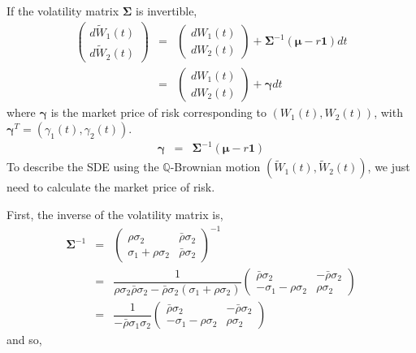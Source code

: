 \documentclass[uplatex,a4j,12pt,dvipdfmx]{jsarticle}
\begin{document}
%
%
If the volatility matrix ${\bm \Sigma}$ is invertible,
%
%
\begin{eqnarray*}
	\left(
	\begin{array}{c}
			d \tilde{W}_{1}(t)
			\\
			d \tilde{W}_{2}(t)
		\end{array}
	\right)
	&=&
	\left(
	\begin{array}{c}
			dW_{1}(t)
			\\
			dW_{2}(t)
		\end{array}
	\right)
	+
	{\bm \Sigma}^{-1}
	( {\bm \mu} - r {\bm 1} ) dt
	\\ &=&
	\left(
	\begin{array}{c}
			dW_{1}(t)
			\\
			dW_{2}(t)
		\end{array}
	\right)
	+
	{\bm \gamma}dt
\end{eqnarray*}
%
%
where ${\bm \gamma}$ is the market price of risk corresponding to $(W_{1}(t),W_{2}(t))$, with ${\bm \gamma}^{T} = (\gamma_{1}(t),\gamma_{2}(t))$.
%
%
\begin{eqnarray*}
	{\bm \gamma}
	&=&
	{\bm \Sigma}^{-1}
	( {\bm \mu} - r {\bm 1} )
\end{eqnarray*}
%
%
To describe the SDE using the $\mathbb{Q}$-Brownian motion $(\tilde{W}_{1}(t),\tilde{W}_{2}(t))$, we just need to calculate the market price of risk.

First, the inverse of the volatility matrix is,
%
%
\begin{eqnarray*}
	{\bm \Sigma}^{-1}
	&=&
	\left(
	\begin{array}{cc}
		\rho \sigma_{2}              & \bar{\rho} \sigma_{2}
		\\
		\sigma_{1} + \rho \sigma_{2} & \bar{\rho} \sigma_{2}
	\end{array}
	\right)^{-1}
	\\ &=&
	\dfrac{1}{
		\rho \sigma_{2} \bar{\rho} \sigma_{2} - \bar{\rho} \sigma_{2}(\sigma_{1} + \rho \sigma_{2}) }
	\left(
	\!\!
	\begin{array}{cc}
			\bar{\rho} \sigma_{2}          & - \bar{\rho} \sigma_{2}
			\\
			- \sigma_{1} - \rho \sigma_{2} & \rho \sigma_{2}
		\end{array}
	\!\!
	\right)
	\\ &=&
	\dfrac{1}{
		- \bar{\rho} \sigma_{1} \sigma_{2} }
	\left(
	\!\!
	\begin{array}{cc}
			\bar{\rho} \sigma_{2}          & - \bar{\rho} \sigma_{2}
			\\
			- \sigma_{1} - \rho \sigma_{2} & \rho \sigma_{2}
		\end{array}
	\!\!
	\right)
\end{eqnarray*}
%
%
and so,
\end{document}
